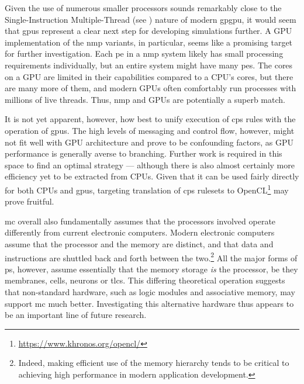 Given the use of numerous smaller processors sounds remarkably close to the Single-Instruction Multiple-Thread (see \cite[Ch. 4.4.1]{Hennessy2012}) nature of modern \gls{gpgpu}, it would seem that \glspl{gpu} represent a clear next step for developing simulations further.  A GPU implementation of the \gls{nmp} variants, in particular, seems like a promising target for further investigation.  Each \gls{pe} in a \gls{nmp} system likely has small processing requirements individually, but an entire system might have many \glspl{pe}.  The cores on a GPU are limited in their capabilities compared to a CPU's cores, but there are many more of them, and modern GPUs often comfortably run processes with millions of live threads.  Thus, \gls{nmp} and GPUs are potentially a superb match.

It is not yet apparent, however, how best to unify execution of \gls{cps} rules with the operation of \glspl{gpu}.  The high levels of messaging and control flow, however, might not fit well with GPU architecture and prove to be confounding factors, as GPU performance is generally averse to branching.  Further work is required in this space to find an optimal strategy --- although there is also almost certainly more efficiency yet to be extracted from CPUs.  Given that it can be used fairly directly for both CPUs and \glspl{gpu}, targeting translation of \gls{cps} \glspl{ruleset} to OpenCL\footnote{\url{https://www.khronos.org/opencl/}} may prove fruitful.

\Gls{mc} overall also fundamentally assumes that the processors involved operate differently from current electronic computers.  Modern electronic computers assume that the processor and the memory are distinct, and that data and instructions are shuttled back and forth between the two.\footnote{Indeed, making efficient use of the memory hierarchy tends to be critical to achieving high performance in modern application development.}  All the major forms of \gls{ps}, however, assume essentially that the memory storage \emph{is} the processor, be they membranes, cells, neurons or \glspl{tlc}.  This differing theoretical operation suggests that non-standard hardware, such as logic modules and associative memory, may support \gls{mc} much better.  Investigating this alternative hardware thus appears to be an important line of future research.


